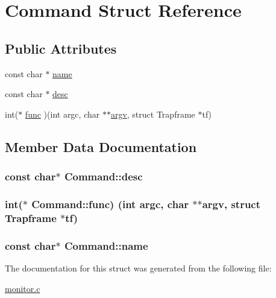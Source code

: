 \hypertarget{structCommand}{}\section{Command Struct Reference}
\label{structCommand}
\subsection*{Public Attributes}
\begin{DoxyCompactItemize}
\item 
const char $\ast$ \hyperlink{structCommand_aaac7db0461198bc84c6bb01e64ae82e3}{name}
\item 
const char $\ast$ \hyperlink{structCommand_a8b1a2161af48dfcc3f8abac9d1b922fe}{desc}
\item 
int($\ast$ \hyperlink{structCommand_a37d451748878a78372ce5764e6d38081}{func} )(int argc, char $\ast$$\ast$\hyperlink{init_8c_abd1a2cf54950f450187ef24c1cdcac0c}{argv}, struct Trapframe $\ast$tf)
\end{DoxyCompactItemize}


\subsection{Member Data Documentation}
\subsubsection[{\texorpdfstring{desc}{desc}}]{\setlength{\rightskip}{0pt plus 5cm}const char$\ast$ Command\+::desc}\hypertarget{structCommand_a8b1a2161af48dfcc3f8abac9d1b922fe}{}\label{structCommand_a8b1a2161af48dfcc3f8abac9d1b922fe}
\subsubsection[{\texorpdfstring{func}{func}}]{\setlength{\rightskip}{0pt plus 5cm}int($\ast$ Command\+::func) (int argc, char $\ast$$\ast${\bf argv}, struct Trapframe $\ast$tf)}\hypertarget{structCommand_a37d451748878a78372ce5764e6d38081}{}\label{structCommand_a37d451748878a78372ce5764e6d38081}
\subsubsection[{\texorpdfstring{name}{name}}]{\setlength{\rightskip}{0pt plus 5cm}const char$\ast$ Command\+::name}\hypertarget{structCommand_aaac7db0461198bc84c6bb01e64ae82e3}{}\label{structCommand_aaac7db0461198bc84c6bb01e64ae82e3}


The documentation for this struct was generated from the following file\+:\begin{DoxyCompactItemize}
\item 
\hyperlink{monitor_8c}{monitor.\+c}\end{DoxyCompactItemize}
